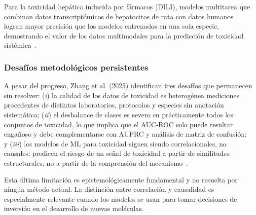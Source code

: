 Para la toxicidad hepática inducida por fármacos (DILI), modelos multitarea que combinan datos transcriptómicos de hepatocitos de rata con datos humanos logran mayor precisión que los modelos entrenados en una sola especie, demostrando el valor de los datos multimodales para la predicción de toxicidad sistémica~\cite{zhang_computational_2025}.
 
\subsubsection{Desafíos metodológicos persistentes}
 
A pesar del progreso, Zhang et al. (2025) identifican tres desafíos que permanecen sin resolver: (\emph{i}) la calidad de los datos de toxicidad es heterogénea mediciones procedentes de distintos laboratorios, protocolos y especies sin anotación sistemática; (\emph{ii}) el desbalance de clases es severo en prácticamente todos los conjuntos de toxicidad, lo que implica
que el AUC-ROC solo puede resultar engañoso y debe complementarse con AUPRC y análisis de matriz de confusión; y (\emph{iii}) los modelos de ML para toxicidad siguen siendo correlacionales, no causales: predicen el riesgo de un señal de toxicidad a partir de similitudes estructurales, no a partir de la comprensión del mecanismo~\cite{zhang_computational_2025}.
 
Esta última limitación es epistemológicamente fundamental y no resuelta por ningún método actual. La distinción entre correlación y causalidad es especialmente relevante cuando los modelos se usan para tomar decisiones de inversión en el desarrollo de nuevas moléculas.



